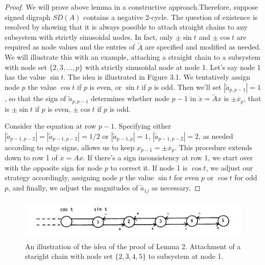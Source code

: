 \begin{proof}
	We will prove above lemma in a constructive approach.Therefore, suppose signed digraph $SD(A)$ contains a negative 2-cycle. The question of existence is resolved by showing that it is always possible to attach straight chains to any subsystem with strictly sinusoidal nodes. In fact, only $\pm\sin t$ and $\pm\cos t$ are required as node values and the entries of $\tilde{A}$ are specified and modified as needed. 
	We will illustrate this with an example, attaching a straight chain to a subsystem  with node set $\{2,3,\ldots, p\}$ with strictly sinusoidal node at node 1. Let's say node 1 has the value $\sin t$. The idea is illustrated in Figure 3.1. We tentatively assign node $p$ the value $\cos t$ if $p$ is even, or $\sin t$ if $p$ is odd. Then we'll set $|\tilde{a}_{p,p-1}| = 1$, so that the sign of $\tilde{a}_{p,p-1}$ determines whether node $p-1$ in $\dot{x} = \tilde{A}x$ is $\pm\dot{x_p}$, that is $\pm \sin t$ if $p$ is even, $\pm \cos t$ if $p$ is odd.
	
	
	Consider the equation at row $p-1$. Specifying either $|\tilde{a}_{p-1,p-2}| = |\tilde{a}_{p-1,p-2}| = 1/2$ or $|\tilde{a}_{p-1,p}| = 1$, $|\tilde{a}_{p-1,p-2}| = 2$, as needed according to edge signs, allows us to keep $x_{p-1} = \pm \dot{x_p}$. This procedure extends down to row 1 of $\dot{x} = Ax$. If there's a sign inconsistency at row 1, we start over with the opposite sign for node $p$ to correct it. If node 1 is $\cos t$, we adjust our strategy accordingly, assigning node $p$ the value $\sin t$ for even $p$ or $\cos t$ for odd $p$, and finally, we adjust the magnitudes of $\tilde{a}_{1j}$ as necessary.
\end{proof}

\begin{figure}[h]
	\includegraphics[height=2.0cm]{figure2.png}
	\caption{An illustration of the idea of the proof of Lemma 2. Attachment of a staright chain with node set $\{2,3,4,5\}$ to subsystem at node 1.} 
\end{figure}

